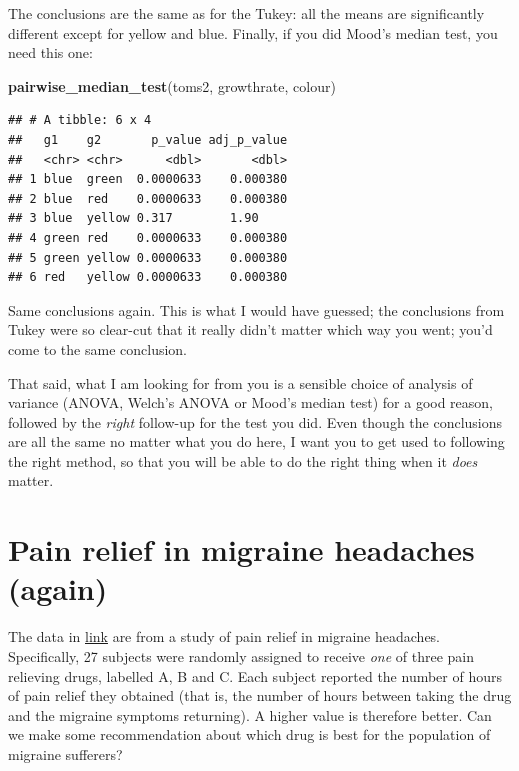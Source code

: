 \documentclass[]{tufte-book}
\newenvironment{Shaded}{}{}
\newcommand{\KeywordTok}[1]{\textcolor[rgb]{0.00,0.44,0.13}{\textbf{#1}}}
\newcommand{\NormalTok}[1]{#1}
\theoremstyle{definition}
\theoremstyle{definition}
\theoremstyle{definition}
\theoremstyle{remark}
\begin{document}
The conclusions are the same as for the Tukey: all the means are
significantly different except for yellow and blue. Finally, if you did
Mood's median test, you need this one:

\begin{Shaded}
\begin{Highlighting}[]
\KeywordTok{pairwise_median_test}\NormalTok{(toms2, growthrate, colour)}
\end{Highlighting}
\end{Shaded}

\begin{verbatim}
## # A tibble: 6 x 4
##   g1    g2       p_value adj_p_value
##   <chr> <chr>      <dbl>       <dbl>
## 1 blue  green  0.0000633    0.000380
## 2 blue  red    0.0000633    0.000380
## 3 blue  yellow 0.317        1.90    
## 4 green red    0.0000633    0.000380
## 5 green yellow 0.0000633    0.000380
## 6 red   yellow 0.0000633    0.000380
\end{verbatim}

Same conclusions again. This is what I would have guessed; the
conclusions from Tukey were so clear-cut that it really didn't matter
which way you went; you'd come to the same conclusion.

That said, what I am looking for from you is a sensible choice of
analysis of variance (ANOVA, Welch's ANOVA or Mood's median test) for a
good reason, followed by the \emph{right} follow-up for the test you
did. Even though the conclusions are all the same no matter what you do
here, I want you to get used to following the right method, so that you
will be able to do the right thing when it \emph{does} matter.

\hypertarget{pain-relief-in-migraine-headaches-again}{%
\section{Pain relief in migraine headaches
(again)}\label{pain-relief-in-migraine-headaches-again}}

The data in
\href{http://www.utsc.utoronto.ca/~butler/c32/migraine.txt}{link} are
from a study of pain relief in migraine headaches. Specifically, 27
subjects were randomly assigned to receive \emph{one} of three pain
relieving drugs, labelled A, B and C. Each subject reported the number
of hours of pain relief they obtained (that is, the number of hours
between taking the drug and the migraine symptoms returning). A higher
value is therefore better. Can we make some recommendation about which
drug is best for the population of migraine sufferers?
\end{document}
